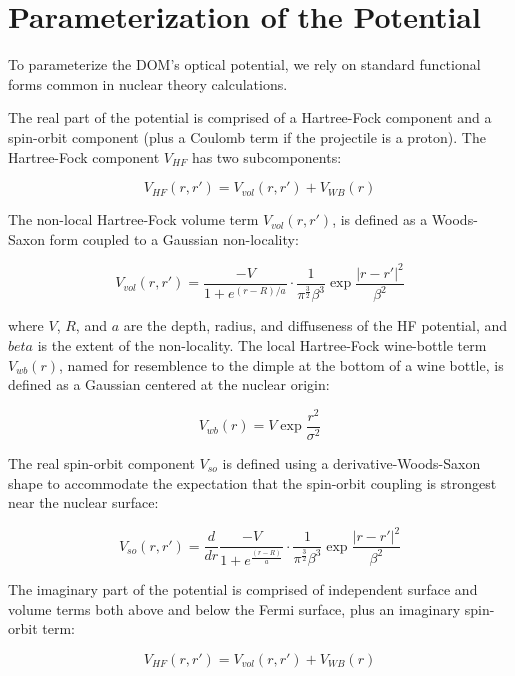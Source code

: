 \section{Parameterization of the Potential}

To parameterize the DOM's optical potential, we rely on standard functional
forms common in nuclear theory calculations.

The real part of the potential is comprised of a Hartree-Fock component and
a spin-orbit component (plus a Coulomb term if the projectile is a proton).
The Hartree-Fock component $V_{HF}$ has two subcomponents:

\begin{equation}
    V_{HF}(r,r') = V_{vol}(r,r') + V_{WB}(r)
\end{equation}

The non-local Hartree-Fock volume term $V_{vol}(r,r')$, is defined as
a Woods-Saxon form coupled to a Gaussian non-locality:

\begin{equation}
    V_{vol}(r,r') =
    \dfrac{-V}{1+e^{(r-R)/a}}\cdot\dfrac{1}{\pi^{\frac{3}{2}}\beta^{3}}
    \exp{\frac{|r-r'|^{2}}{\beta^{2}}}
\end{equation}

where $V$, $R$, and $a$ are the depth, radius, and diffuseness of the HF potential,
and $beta$ is the extent of the non-locality. The local Hartree-Fock wine-bottle
term $V_{wb}(r)$, named for resemblence to the dimple at the bottom of a wine
bottle, is defined as a Gaussian centered at the nuclear origin:

\begin{equation}
    V_{wb}(r) = V\exp{\frac{r^{2}}{\sigma^{2}}}
\end{equation}

The real spin-orbit component $V_{so}$
is defined using a derivative-Woods-Saxon shape to
accommodate the expectation that the spin-orbit coupling is strongest near the
nuclear surface:

\begin{equation}
    V_{so}(r,r') =
    \frac{d}{dr} \frac{-V}{1+e^{\frac{(r-R)}{a}}}\cdot\frac{1}{\pi^{\frac{3}{2}}\beta^{3}} \exp{\frac{|r-r'|^{2}}{\beta^{2}}}
\end{equation}

The imaginary part of the potential is comprised of independent surface and volume terms
both above and below the Fermi surface, plus an imaginary spin-orbit term:

\begin{equation}
    V_{HF}(r,r') = V_{vol}(r,r') + V_{WB}(r)
\end{equation}

